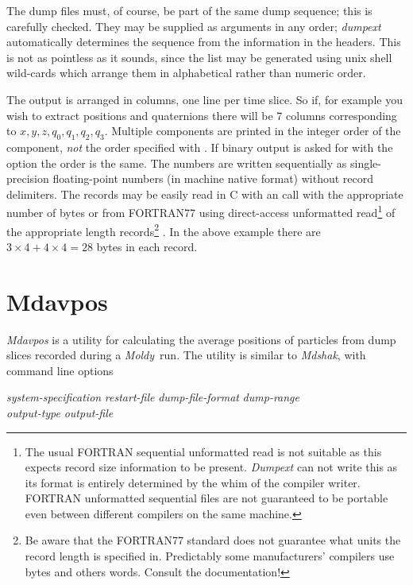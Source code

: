 \documentclass[a4paper,twoside]{report}
\newcommand{\moldy}{\emph{Moldy}}
\begin{document}
The dump files must, of course, be part of the same dump sequence;
this is carefully checked.  They may be supplied as arguments in any
order; \emph{dumpext} automatically determines the sequence from
the information in the headers.  This is not as pointless as it sounds,
since the list may be generated using unix shell wild-cards which arrange
them in alphabetical rather than numeric order.

The output is arranged in columns, one line per time slice.  So if,
for example you wish to extract positions and quaternions there will
be 7 columns corresponding to $x,y,z,q_0,q_1,q_2,q_3$. Multiple
components are printed in the integer order of the component,
\emph{not} the order specified with . If binary output is
asked for with the  option the order is the same. The numbers
are written sequentially as single-precision floating-point numbers
(in machine native format) without record delimiters.  The records may
be easily read in C with an  call with the appropriate
number of bytes or from FORTRAN77 using direct-access unformatted
read\footnote{The usual FORTRAN sequential unformatted read is not
  suitable as this expects record size information to be present.
  \emph{Dumpext} can not write this as its format is entirely
  determined by the whim of the compiler writer.  FORTRAN unformatted
  sequential files are not guaranteed to be portable even between
  different compilers on the same machine.} of the appropriate length
records\footnote{Be aware that the FORTRAN77 standard does not
  guarantee what units the record length is specified in.  Predictably
  some manufacturers' compilers use bytes and others words.  Consult
  the documentation!} .  In
the above example there are $3 \times 4 + 4 \times 4 = 28$ bytes in
each record.

\section{Mdavpos}%

\emph{Mdavpos} is a utility for calculating the average positions of particles
from dump slices recorded during a \moldy\ run. The utility is similar to
\emph{Mdshak}, with command line options

\begin{center}
\Lit{[-s} \textit{system-specification} \Lit{|}
 \textit{restart-file}\Lit{]}
\Lit{[-d} \textit{dump-file-format}\Lit{]}
\Lit{[-t} \textit{dump-range}\Lit{]} \\
\Lit{[-f} \textit{output-type}\Lit{]} 
\Lit{[-a]}
\Lit{[-l]}
\Lit{[-i]}
\Lit{[-o} \textit{output-file}\Lit{]}
\end{center}
\end{document}
